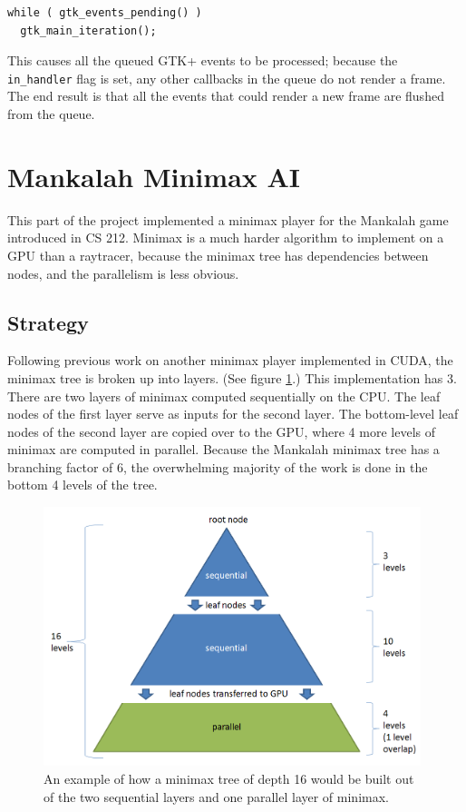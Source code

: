 \documentclass{article}
\begin{document}
\begin{lstlisting}
while ( gtk_events_pending() )
  gtk_main_iteration();
\end{lstlisting}

This causes all the queued GTK+ events to be processed; because the \texttt{in\_handler} flag is set, any other callbacks in the queue do not render a frame. The end result is that all the events that could render a new frame are flushed from the queue.

\section{Mankalah Minimax AI}
This part of the project implemented a minimax player for the Mankalah game introduced in CS 212. Minimax is a much harder algorithm to implement on a GPU than a raytracer, because the minimax tree has dependencies between nodes, and the parallelism is less obvious.

\subsection{Strategy}
Following previous work on another minimax player implemented in CUDA\cite{rockisuda10}, the minimax tree is broken up into layers. (See figure \ref{fig:mankalahdepths}.) This implementation has 3. There are two layers of minimax computed sequentially on the CPU. The leaf nodes of the first layer serve as inputs for the second layer. The bottom-level leaf nodes of the second layer are copied over to the GPU, where 4 more levels of minimax are computed in parallel. Because the Mankalah minimax tree has a branching factor of 6, the overwhelming majority of the work is done in the bottom 4 levels of the tree.

\begin{figure}[ht!]
\centering
\includegraphics[width=110mm]{mankalah-depths.png}
\caption{An example of how a minimax tree of depth 16 would be built out of the two sequential layers and one parallel layer of minimax.}
\label{fig:mankalahdepths}
\end{figure}
\end{document}
